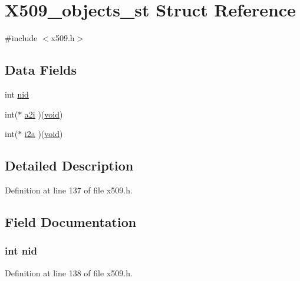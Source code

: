 \hypertarget{struct_x509__objects__st}{}\section{X509\+\_\+objects\+\_\+st Struct Reference}
\label{struct_x509__objects__st}


{\ttfamily \#include $<$x509.\+h$>$}

\subsection*{Data Fields}
\begin{DoxyCompactItemize}
\item 
int \hyperlink{struct_x509__objects__st_a7235ef62e89328f5155846dc59c6fc37}{nid}
\item 
int($\ast$ \hyperlink{struct_x509__objects__st_af5b00905fbb0c26534ca56edd836db28}{a2i} )(\hyperlink{hw__4758__cca_8h_afad4d591c7931ff6dc5bf69c76c96aa0}{void})
\item 
int($\ast$ \hyperlink{struct_x509__objects__st_a259abb086fee469632375e311a8628cb}{i2a} )(\hyperlink{hw__4758__cca_8h_afad4d591c7931ff6dc5bf69c76c96aa0}{void})
\end{DoxyCompactItemize}


\subsection{Detailed Description}


Definition at line 137 of file x509.\+h.



\subsection{Field Documentation}
\subsubsection[{\texorpdfstring{nid}{nid}}]{\setlength{\rightskip}{0pt plus 5cm}int nid}\hypertarget{struct_x509__objects__st_a7235ef62e89328f5155846dc59c6fc37}{}\label{struct_x509__objects__st_a7235ef62e89328f5155846dc59c6fc37}


Definition at line 138 of file x509.\+h.

